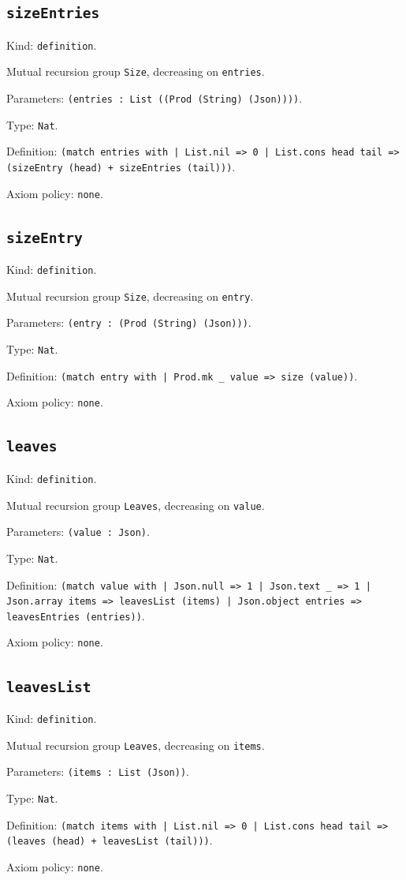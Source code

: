 \documentclass[11pt]{article}
\begin{document}
\subsection*{\texttt{sizeEntries}}
\noindent Kind: \texttt{definition}.\par
\noindent Mutual recursion group \texttt{Size}, decreasing on \texttt{entries}.\par
\noindent Parameters: \texttt{(entries : List ((Prod (String) (Json))))}.\par
\noindent Type: \texttt{Nat}.\par
\noindent Definition: \texttt{(match entries with | List.nil => 0 | List.cons head tail => (sizeEntry (head) + sizeEntries (tail)))}.\par
\noindent Axiom policy: \texttt{none}.\par
\subsection*{\texttt{sizeEntry}}
\noindent Kind: \texttt{definition}.\par
\noindent Mutual recursion group \texttt{Size}, decreasing on \texttt{entry}.\par
\noindent Parameters: \texttt{(entry : (Prod (String) (Json)))}.\par
\noindent Type: \texttt{Nat}.\par
\noindent Definition: \texttt{(match entry with | Prod.mk \_ value => size (value))}.\par
\noindent Axiom policy: \texttt{none}.\par
\subsection*{\texttt{leaves}}
\noindent Kind: \texttt{definition}.\par
\noindent Mutual recursion group \texttt{Leaves}, decreasing on \texttt{value}.\par
\noindent Parameters: \texttt{(value : Json)}.\par
\noindent Type: \texttt{Nat}.\par
\noindent Definition: \texttt{(match value with | Json.null => 1 | Json.text \_ => 1 | Json.array items => leavesList (items) | Json.object entries => leavesEntries (entries))}.\par
\noindent Axiom policy: \texttt{none}.\par
\subsection*{\texttt{leavesList}}
\noindent Kind: \texttt{definition}.\par
\noindent Mutual recursion group \texttt{Leaves}, decreasing on \texttt{items}.\par
\noindent Parameters: \texttt{(items : List (Json))}.\par
\noindent Type: \texttt{Nat}.\par
\noindent Definition: \texttt{(match items with | List.nil => 0 | List.cons head tail => (leaves (head) + leavesList (tail)))}.\par
\noindent Axiom policy: \texttt{none}.\par
\end{document}
